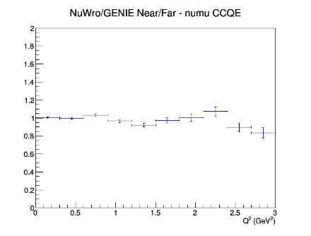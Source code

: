 \begin{figure}[h]
\endminipage
{}
\includegraphics[width=\linewidth]{Q2/nominal/ratios/CCQE_NuWro_GENIE_numu_NF_Q2.png}
\endminipage
\newline
\end{figure}
\clearpage
